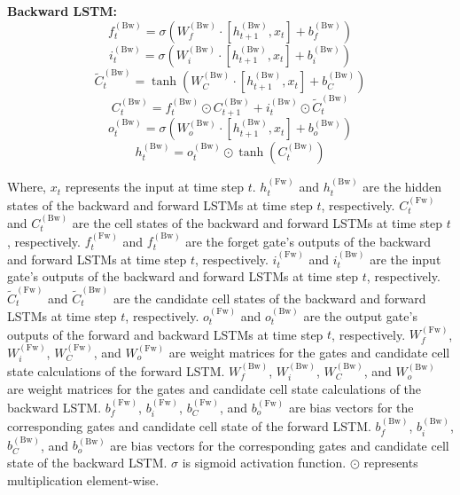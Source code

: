 \documentclass[sn-mathphys,Numbered]{sn-jnl}
\theoremstyle{thmstyleone}
\theoremstyle{thmstyletwo}
\theoremstyle{thmstylethree}
\begin{document}
\textbf{Backward LSTM:}
\begin{equation}
f_t^{(\text{Bw})} = \sigma(W_{f}^{(\text{Bw})} \cdot [h_{t+1}^{(\text{Bw})}, x_t] + b_{f}^{(\text{Bw})})
\end{equation}
\begin{equation}
i_t^{(\text{Bw})} = \sigma(W_{i}^{(\text{Bw})} \cdot [h_{t+1}^{(\text{Bw})}, x_t] + b_{i}^{(\text{Bw})})
\end{equation}
\begin{equation}
\tilde{C}_t^{(\text{Bw})} = \tanh(W_{C}^{(\text{Bw})} \cdot [h_{t+1}^{(\text{Bw})}, x_t] + b_{C}^{(\text{Bw})})
\end{equation}
\begin{equation}
C_t^{(\text{Bw})} = f_t^{(\text{Bw})} \odot C_{t+1}^{(\text{Bw})} + i_t^{(\text{Bw})} \odot \tilde{C}_t^{(\text{Bw})}
\end{equation}
\begin{equation}
o_t^{(\text{Bw})} = \sigma(W_{o}^{(\text{Bw})} \cdot [h_{t+1}^{(\text{Bw})}, x_t] + b_{o}^{(\text{Bw})})
\end{equation}
\begin{equation}
h_t^{(\text{Bw})} = o_t^{(\text{Bw})} \odot \tanh(C_t^{(\text{Bw})})
\end{equation}

Where, \(x_t\) represents the input at time step \(t\).
 \(h_t^{(\text{Fw})}\) and \(h_t^{(\text{Bw})}\) are the hidden states of the backward and forward LSTMs at time step \(t\), respectively.
 \(C_t^{(\text{Fw})}\) and \(C_t^{(\text{Bw})}\) are the cell states of the backward and forward LSTMs at time step \(t\), respectively.
 \(f_t^{(\text{Fw})}\) and \(f_t^{(\text{Bw})}\) are the forget gate's outputs of the backward and forward LSTMs at time step \(t\), respectively.
 \(i_t^{(\text{Fw})}\) and \(i_t^{(\text{Bw})}\) are the input gate's outputs of the backward and forward LSTMs at time step \(t\), respectively.
 \(\tilde{C}_t^{(\text{Fw})}\) and \(\tilde{C}_t^{(\text{Bw})}\) are the candidate cell states of the backward and forward LSTMs at time step \(t\), respectively.
 \(o_t^{(\text{Fw})}\) and \(o_t^{(\text{Bw})}\) are the output gate's outputs of the forward and backward LSTMs at time step \(t\), respectively.
 \(W_{f}^{(\text{Fw})}\), \(W_{i}^{(\text{Fw})}\), \(W_{C}^{(\text{Fw})}\), and \(W_{o}^{(\text{Fw})}\) are weight matrices for the gates and candidate cell state calculations of the forward LSTM.
 \(W_{f}^{(\text{Bw})}\), \(W_{i}^{(\text{Bw})}\), \(W_{C}^{(\text{Bw})}\), and \(W_{o}^{(\text{Bw})}\) are weight matrices for the gates and candidate cell state calculations of the backward LSTM.
 \(b_{f}^{(\text{Fw})}\), \(b_{i}^{(\text{Fw})}\), \(b_{C}^{(\text{Fw})}\), and \(b_{o}^{(\text{Fw})}\) are bias vectors for the corresponding gates and candidate cell state of the forward LSTM.
 \(b_{f}^{(\text{Bw})}\), \(b_{i}^{(\text{Bw})}\), \(b_{C}^{(\text{Bw})}\), and \(b_{o}^{(\text{Bw})}\) are bias vectors for the corresponding gates and candidate cell state of the backward LSTM.
 \(\sigma\) is sigmoid activation function.
 \(\odot\) represents  multiplication element-wise.
\end{document}
